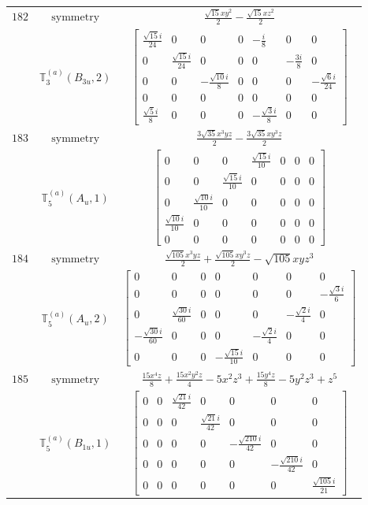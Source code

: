 \documentclass[fleqn,8pt,landscape]{jsarticle}
\begin{document}
\begin{longtable}{ccc}
$ 182 $ & $ \text{symmetry} $ & $ \frac{\sqrt{15} x y^{2}}{2} - \frac{\sqrt{15} x z^{2}}{2} $ \\
$  $ & $ \mathbb{T}_{3}^{(a)}(B_{3u},2) $ & $ \begin{bmatrix} \frac{\sqrt{15} i}{24} & 0 & 0 & 0 & - \frac{i}{8} & 0 & 0 \\ 0 & \frac{\sqrt{15} i}{24} & 0 & 0 & 0 & - \frac{3 i}{8} & 0 \\ 0 & 0 & - \frac{\sqrt{10} i}{8} & 0 & 0 & 0 & - \frac{\sqrt{6} i}{24} \\ 0 & 0 & 0 & 0 & 0 & 0 & 0 \\ \frac{\sqrt{5} i}{8} & 0 & 0 & 0 & - \frac{\sqrt{3} i}{8} & 0 & 0 \end{bmatrix} $ \\ \hline
$ 183 $ & $ \text{symmetry} $ & $ \frac{3 \sqrt{35} x^{3} y z}{2} - \frac{3 \sqrt{35} x y^{3} z}{2} $ \\
$  $ & $ \mathbb{T}_{5}^{(a)}(A_{u},1) $ & $ \begin{bmatrix} 0 & 0 & 0 & \frac{\sqrt{15} i}{10} & 0 & 0 & 0 \\ 0 & 0 & \frac{\sqrt{15} i}{10} & 0 & 0 & 0 & 0 \\ 0 & \frac{\sqrt{10} i}{10} & 0 & 0 & 0 & 0 & 0 \\ \frac{\sqrt{10} i}{10} & 0 & 0 & 0 & 0 & 0 & 0 \\ 0 & 0 & 0 & 0 & 0 & 0 & 0 \end{bmatrix} $ \\ \hline
$ 184 $ & $ \text{symmetry} $ & $ \frac{\sqrt{105} x^{3} y z}{2} + \frac{\sqrt{105} x y^{3} z}{2} - \sqrt{105} x y z^{3} $ \\
$  $ & $ \mathbb{T}_{5}^{(a)}(A_{u},2) $ & $ \begin{bmatrix} 0 & 0 & 0 & 0 & 0 & 0 & 0 \\ 0 & 0 & 0 & 0 & 0 & 0 & - \frac{\sqrt{3} i}{6} \\ 0 & \frac{\sqrt{30} i}{60} & 0 & 0 & 0 & - \frac{\sqrt{2} i}{4} & 0 \\ - \frac{\sqrt{30} i}{60} & 0 & 0 & 0 & - \frac{\sqrt{2} i}{4} & 0 & 0 \\ 0 & 0 & 0 & - \frac{\sqrt{15} i}{10} & 0 & 0 & 0 \end{bmatrix} $ \\ \hline
$ 185 $ & $ \text{symmetry} $ & $ \frac{15 x^{4} z}{8} + \frac{15 x^{2} y^{2} z}{4} - 5 x^{2} z^{3} + \frac{15 y^{4} z}{8} - 5 y^{2} z^{3} + z^{5} $ \\
$  $ & $ \mathbb{T}_{5}^{(a)}(B_{1u},1) $ & $ \begin{bmatrix} 0 & 0 & \frac{\sqrt{21} i}{42} & 0 & 0 & 0 & 0 \\ 0 & 0 & 0 & \frac{\sqrt{21} i}{42} & 0 & 0 & 0 \\ 0 & 0 & 0 & 0 & - \frac{\sqrt{210} i}{42} & 0 & 0 \\ 0 & 0 & 0 & 0 & 0 & - \frac{\sqrt{210} i}{42} & 0 \\ 0 & 0 & 0 & 0 & 0 & 0 & \frac{\sqrt{105} i}{21} \end{bmatrix} $ \\ \hline

\end{longtable}
\end{document}
